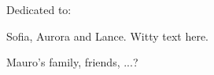%
%
\thispagestyle{empty}
{}

\vspace*{3cm}

\begin{center}
    Dedicated to:

\par
    Sofia, Aurora and Lance.  Witty text here.

\par
    Mauro's family, friends, ...?

\end{center}
